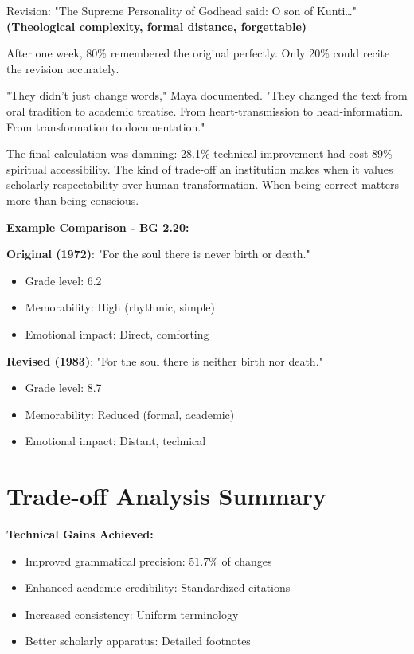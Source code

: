 \documentclass[11pt,twoside]{book}
\begin{document}
Revision: "The Supreme Personality of Godhead said: O son of Kunti\ldots{}"
\textbf{(Theological complexity, formal distance, forgettable)}

After one week, 80\% remembered the original perfectly. Only 20\% could recite the revision accurately.

"They didn't just change words," Maya documented. "They changed the text from oral tradition to academic treatise. From heart-transmission to head-information. From transformation to documentation."

The final calculation was damning: 28.1\% technical improvement had cost 89\% spiritual accessibility. The kind of trade-off an institution makes when it values scholarly respectability over human transformation. When being correct matters more than being conscious.

\textbf{\textbf{Example Comparison - BG 2.20:}}

\textbf{\textbf{Original (1972)}}: "For the soul there is never birth or death."
\begin{itemize}
\item Grade level: 6.2
\item Memorability: High (rhythmic, simple)
\item Emotional impact: Direct, comforting
\end{itemize}

\textbf{\textbf{Revised (1983)}}: "For the soul there is neither birth nor death."
\begin{itemize}
\item Grade level: 8.7
\item Memorability: Reduced (formal, academic)
\item Emotional impact: Distant, technical
\end{itemize}
\section*{Trade-off Analysis Summary}
\label{sec:org6be657b}

\textbf{\textbf{Technical Gains Achieved:}}
\begin{itemize}
\item Improved grammatical precision: 51.7\% of changes
\item Enhanced academic credibility: Standardized citations
\item Increased consistency: Uniform terminology
\item Better scholarly apparatus: Detailed footnotes
\end{itemize}
\end{document}
